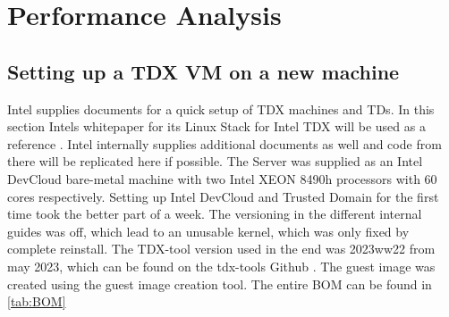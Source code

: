\chapter{Performance Analysis}

\label{performance}

\section{Setting up a TDX VM on a new machine}
\label{ch:SettingUpTDX}
Intel supplies documents for a quick setup of TDX machines and TDs. In this section Intels whitepaper for its Linux Stack for Intel TDX will be used as a reference \cite{noauthor_white_nodate}. Intel internally supplies additional documents as well and code from there will be replicated here if possible. The Server was supplied as an Intel DevCloud bare-metal machine with two Intel XEON 8490h processors with 60 cores respectively. Setting up Intel DevCloud and Trusted Domain for the first time took the better part of a week. The versioning in the different internal guides was off, which lead to an unusable kernel, which was only fixed by complete reinstall. The TDX-tool version used in the end was 2023ww22 from may 2023, which can be found on the tdx-tools Github \cite{intel_corporation_inteltdx-tools_2024}. The guest image was created using the guest image creation tool. The entire BOM can be found in \cref{tab:BOM}

